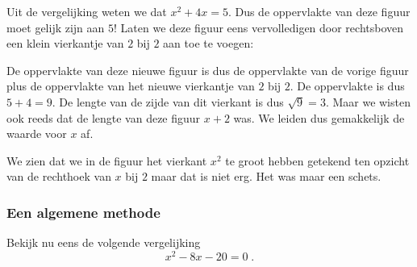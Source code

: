 Uit de vergelijking weten we dat $x^2+4x=5$. Dus de oppervlakte van deze figuur moet gelijk zijn aan $5$! Laten we deze figuur eens vervolledigen door rechtsboven een klein vierkantje van $2$ bij $2$ aan toe te voegen:

\begin{center}

\end{center}

De oppervlakte van deze nieuwe figuur is dus de oppervlakte van de vorige figuur plus de oppervlakte van het nieuwe vierkantje van $2$ bij $2$. De oppervlakte is dus $5 + 4 = 9$. De lengte van de zijde van dit vierkant is dus $\sqrt{9}=3$. Maar we wisten ook reeds dat de lengte van deze figuur $x+2$ was. We leiden dus gemakkelijk de waarde voor $x$ af.



We zien dat we in de figuur het vierkant $x^2$ te groot hebben getekend ten opzicht van de rechthoek van $x$ bij $2$ maar dat is niet erg. Het was maar een schets.



\subsubsection{Een algemene methode}

Bekijk nu eens de volgende vergelijking
$$
x^2-8x-20 = 0\;.
$$


